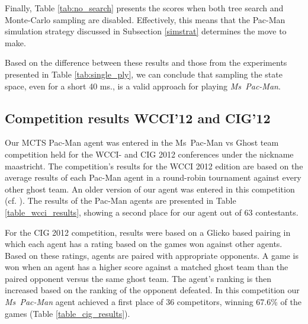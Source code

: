 \documentclass[journal]{IEEEtran}
\begin{document}
Finally, Table \ref{tab:no_search} presents the scores when both tree search and Monte-Carlo sampling are disabled. Effectively, this means that the Pac-Man simulation strategy discussed in Subsection \ref{simstrat} determines the move to make. 

Based on the difference between these results and those from the experiments presented in Table \ref{tab:single_ply}, we can conclude that sampling the state space, even for a short 40 ms., is a valid approach for playing {\it{Ms~Pac-Man}}.

\subsection{Competition results WCCI'12 and CIG'12}
Our {\sc MCTS Pac-Man} agent was entered in the Ms~Pac-Man vs Ghost team competition \cite{mspacmanvsghost} held for the WCCI- and CIG 2012 conferences under the nickname {\sc maastricht}. The competition's results for the WCCI 2012 edition are based on the average results of each Pac-Man agent in a round-robin tournament against every other ghost team. An older version of our agent was entered in this competition (cf. \cite{enhancementspacmancig12}). The results of the Pac-Man agents are presented in Table \ref{table_wcci_results}, showing a second place for our agent out of 63 contestants. 

For the CIG 2012 competition, results were based on a Glicko based pairing in which each agent has a rating based on the games won against other agents. Based on these ratings, agents are paired with appropriate opponents. A game is won when an agent has a higher score against a matched ghost team than the paired opponent versus the same ghost team. The agent's ranking is then increased based on the ranking of the opponent defeated. In this competition our {\it{Ms~Pac-Man}} agent achieved a first place of 36 competitors, winning 67.6\% of the games (Table \ref{table_cig_results}). 
\end{document}
